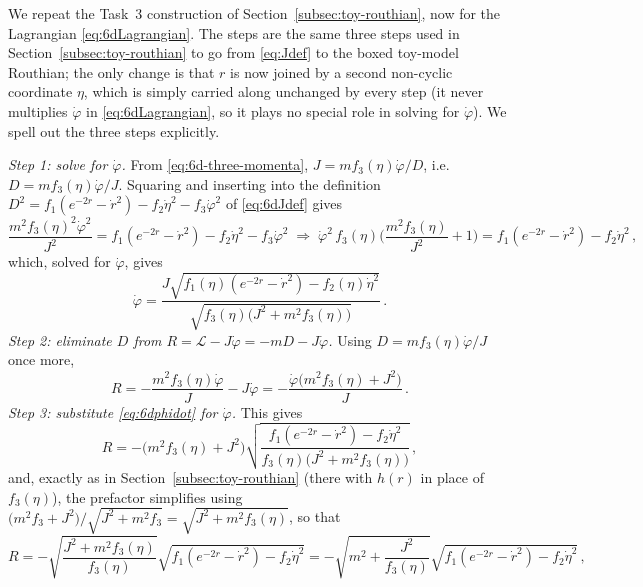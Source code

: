 \documentclass[11pt]{article}
\begin{document}
We repeat the Task~3 construction of Section~\ref{subsec:toy-routhian}, now for the Lagrangian \eqref{eq:6dLagrangian}. The steps are the same three steps used in Section~\ref{subsec:toy-routhian} to go from \eqref{eq:Jdef} to the boxed toy-model Routhian; the only change is that $r$ is now joined by a second non-cyclic coordinate $\eta$, which is simply carried along unchanged by every step (it never multiplies $\dot\varphi$ in \eqref{eq:6dLagrangian}, so it plays no special role in solving for $\dot\varphi$). We spell out the three steps explicitly.

\emph{Step 1: solve for $\dot\varphi$.} From \eqref{eq:6d-three-momenta}, $J=mf_3(\eta)\dot\varphi/D$, i.e.\ $D=mf_3(\eta)\dot\varphi/J$. Squaring and inserting into the definition $D^2=f_1(e^{-2r}-\dot r^2)-f_2\dot\eta^2-f_3\dot\varphi^2$ of \eqref{eq:6dJdef} gives
\begin{equation}
\frac{m^2f_3(\eta)^2\dot\varphi^2}{J^2}=f_1(e^{-2r}-\dot r^2)-f_2\dot\eta^2-f_3\dot\varphi^2
\;\Longrightarrow\;
\dot\varphi^2\,f_3(\eta)\Big(\frac{m^2f_3(\eta)}{J^2}+1\Big)=f_1(e^{-2r}-\dot r^2)-f_2\dot\eta^2\,,
\end{equation}
which, solved for $\dot\varphi$, gives
\begin{equation}
\dot\varphi
=
\frac{J\sqrt{f_1(\eta)(e^{-2r}-\dot r^2)-f_2(\eta)\dot\eta^2}}{\sqrt{f_3(\eta)\big(J^2+m^2f_3(\eta)\big)}}\,.
\label{eq:6dphidot}
\end{equation}
\emph{Step 2: eliminate $D$ from $R=\mathcal L-J\dot\varphi=-mD-J\dot\varphi$.} Using $D=mf_3(\eta)\dot\varphi/J$ once more,
\begin{equation}
R=-\frac{m^2f_3(\eta)\dot\varphi}{J}-J\dot\varphi=-\frac{\dot\varphi\big(m^2f_3(\eta)+J^2\big)}{J}\,.
\end{equation}
\emph{Step 3: substitute \eqref{eq:6dphidot} for $\dot\varphi$.} This gives
\begin{equation}
R=-\big(m^2f_3(\eta)+J^2\big)\sqrt{\frac{f_1(e^{-2r}-\dot r^2)-f_2\dot\eta^2}{f_3(\eta)\big(J^2+m^2f_3(\eta)\big)}}\,,
\end{equation}
and, exactly as in Section~\ref{subsec:toy-routhian} (there with $h(r)$ in place of $f_3(\eta)$), the prefactor simplifies using $\big(m^2f_3+J^2\big)/\sqrt{J^2+m^2f_3}=\sqrt{J^2+m^2f_3(\eta)}$, so that
\begin{equation}
R=-\sqrt{\frac{J^2+m^2f_3(\eta)}{f_3(\eta)}}\sqrt{f_1(e^{-2r}-\dot r^2)-f_2\dot\eta^2}
=-\sqrt{m^2+\frac{J^2}{f_3(\eta)}}\sqrt{f_1(e^{-2r}-\dot r^2)-f_2\dot\eta^2}\,,
\end{equation}
\end{document}

